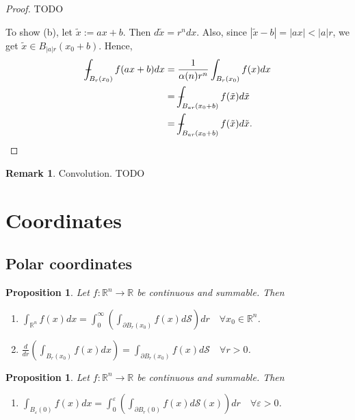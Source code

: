 \documentclass[11pt,a4paper]{report}
\newtheorem{proposition}[theorem]{Proposition}
\theoremstyle{definition}
\newtheorem{remark}[theorem]{Remark}
\def\Xint#1{\mathchoice
{\XXint\displaystyle\textstyle{#1}}%
{\XXint\textstyle\scriptstyle{#1}}%
{\XXint\scriptstyle\scriptscriptstyle{#1}}%
{\XXint\scriptscriptstyle\scriptscriptstyle{#1}}%
\!\int}
\def\XXint#1#2#3{{\setbox0=\hbox{$#1{#2#3}{\int}$}
\vcenter{\hbox{$#2#3$}}\kern-.5\wd0}}
\def\dashint{\Xint-}
\begin{document}
\begin{proof} 
	TODO 

	To show (b), let $\tilde{x} := ax + b$. 
	Then $d \tilde{x} = r^n dx$.
	Also, since $\left\vert \tilde{x} - b \right\vert = \left\vert ax \right\vert < \left\vert a \right\vert r$, we get $\tilde{x} \in B_{\left\vert a \right\vert r}(x_0 + b)$.
	Hence, 
	\begin{align*}
		\dashint_{B_r(x_0)} f(ax + b) dx &= \frac{1}{\alpha(n) r^{n}} \int_{B_r(x_0)} f(x) d x \\
		&= \dashint_{B_{ar}(x_0 + b)} f(\tilde{x}) d\tilde{x} \\
		&= \dashint_{B_{ar}(x_0 + b)} f(\tilde{x}) d\tilde{x}.
	\end{align*}
\end{proof}

\begin{remark}
	Convolution. TODO
\end{remark}

\section{Coordinates}

\subsection{Polar coordinates}

\begin{proposition}

Let $f: \mathbb{R}^{n} \rightarrow \mathbb{R}$ be continuous and summable. 
Then
\begin{enumerate}[label=(\alph*)]
\rm\item $\displaystyle \int_{\mathbb{R}^{n}} f(x) d x=\int_{0}^{\infty}\left(\int_{\partial B_r(x_{0})} f(x) d\mathcal{S}\right) d r \quad \forall x_{0} \in \mathbb{R}^{n}$.
\rm\item $\displaystyle \frac{d}{d r}\left(\int_{B_r(x_{0})} f(x) d x\right)=\int_{\partial B_r(x_{0})} f(x) d\mathcal{S} \quad \forall r>0$.
\end{enumerate}
\end{proposition}

\begin{proposition}

	Let $f: \mathbb{R}^{n} \rightarrow \mathbb{R}$ be continuous and summable. 
	Then
	\begin{enumerate}[label=(\alph*)]
	\rm\item $\displaystyle \int_{B_{\varepsilon}(0)} f(x) dx = \int_{0}^{\varepsilon} \left( \int_{\partial B_r(0)} f(x) d\mathcal{S}(x) \right) dr \quad \forall \varepsilon>0$.
	\end{enumerate}
	\end{proposition}
\end{document}
